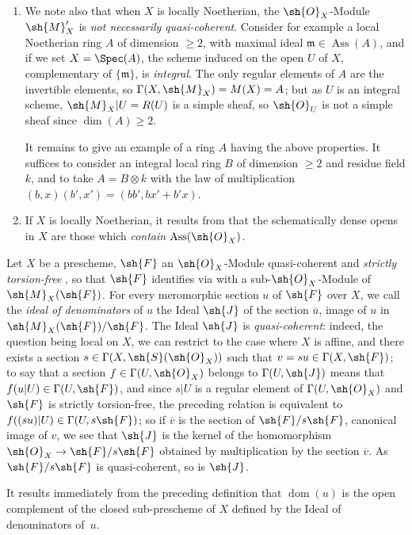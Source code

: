 \begin{remarks}[20.2.13]
\begin{enumerate}[label=(\roman*)]
  \item We note also that when $X$ is locally Noetherian, the $\sh{O}_X$-Module $\sh{M}'_X$ is \emph{not necessarily quasi-coherent}.
  Consider for example a local Noetherian ring $A$ of dimension $\geq 2$, with maximal ideal $\mathfrak{m}\in\operatorname{Ass}(A)$, and if we set $X=\Spec(A)$, the scheme induced on the open $U$ of $X$, complementary of $\{\mathfrak{m}\}$, is \emph{integral}.
  The only regular elements of $A$ are the invertible elements, so $\Gamma(X,\sh{M}_X)=M(X)=A$;
  but as $U$ is an integral scheme, $\sh{M}_X|U=R(U)$ is a simple sheaf, so $\sh{O}_U$ is not a simple sheaf since $\dim(A)\geq 2$.

  It remains to give an example of a ring $A$ having the above properties.
  It suffices to consider an integral local ring $B$ of dimension $\geq 2$ and residue field $k$, and to take $A=B\otimes k$ with the law of multiplication $(b,x)(b',x')=(bb',bx'+b'x)$.

  \item If $X$ is locally Noetherian, it results from  that the schematically dense opens in $X$ are those which \emph{contain} $\operatorname{Ass}(\sh{O}_X)$.
\end{enumerate}
\end{remarks}

\begin{env}[20.2.14]
\label{IV.20.2.14}
Let $X$ be a prescheme, $\sh{F}$ an $\sh{O}_X$-Module quasi-coherent and \emph{strictly torsion-free} , so that $\sh{F}$ identifies via  with a sub-$\sh{O}_X$-Module of $\sh{M}_X(\sh{F})$.
For every meromorphic section $u$ of $\sh{F}$ over $X$, we call the \emph{ideal of denominators} of $u$ the Ideal $\sh{J}$ of the section $\overline{u}$, image of $u$ in $\sh{M}_X(\sh{F})/\sh{F}$.
The Ideal $\sh{J}$ is \emph{quasi-coherent}:
indeed, the question being local on $X$, we can restrict to the case where $X$ is affine, and there exists a section $s\in\Gamma(X,\sh{S}(\sh{O}_X))$ such that $v=su\in\Gamma(X,\sh{F})$;
to say that a section $f\in\Gamma(U,\sh{O}_X)$ belongs to $\Gamma(U,\sh{J})$ means that $f(u|U)\in\Gamma(U,\sh{F})$, and since $s|U$ is a regular element of $\Gamma(U,\sh{O}_X)$ and $\sh{F}$ is strictly torsion-free, the preceding relation is equivalent to $f((su)|U)\in\Gamma(U,s\sh{F})$;
so if $\overline{v}$ is the section of $\sh{F}/s\sh{F}$, canonical image of $v$, we see that $\sh{J}$ is the kernel of the homomorphism $\sh{O}_X\to\sh{F}/s\sh{F}$ obtained by multiplication by the section $\overline{v}$.
As $\sh{F}/s\sh{F}$ is quasi-coherent, so is $\sh{J}$.

It results immediately from the preceding definition that $\operatorname{dom}(u)$ is the open complement of the closed sub-prescheme of $X$ defined by the Ideal of denominators of~$u$.
\end{env}

